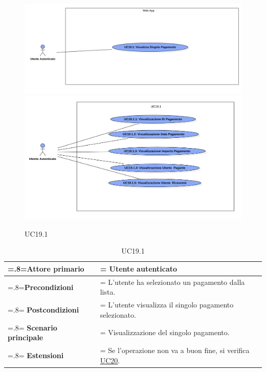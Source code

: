             \begin{figure}[H]
                \centering
                \includegraphics[scale=0.4]{src/img/UC19.1.png}
                \includegraphics[scale=0.4]{src/img/UC19.1.x.png}
                \caption{UC19.1}
            \end{figure}

            \begin{table}[H]
                \centering
                \renewcommand{\arraystretch}{1.8}
                \renewcommand\tabularxcolumn[1]{m{#1}}
                \begin{tabularx}{0.9\textwidth} {
                    >{\hsize=.8\hsize\linewidth=\hsize}X
                    >{\hsize=1.2\hsize\linewidth=\hsize}X}
                    \hline
                    \textbf{Attore primario} & Utente autenticato \\
                    \hline
                    \textbf{Precondizioni} & L'utente ha selezionato un pagamento dalla lista. \\
                    \hline
                    \textbf{Postcondizioni} & L'utente visualizza il singolo pagamento selezionato. \\
                    \hline
                    \textbf{Scenario principale} & Visualizzazione del singolo pagamento. \\
                    \hline
                    \textbf{Estensioni} & Se l'operazione non va a buon fine, si verifica \hyperref[UC20]{UC20}. \\
                    \hline
                \end{tabularx}
                \caption{UC19.1}
            \end{table}


